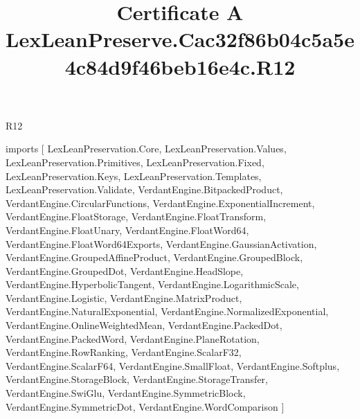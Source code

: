 \begin{lexlean}{R12}
\title{Certificate A LexLeanPreserve.Cac32f86b04c5a5e4c84d9f46beb16e4c.R12}
\begin{coremodule}
imports [
  LexLeanPreservation.Core,
  LexLeanPreservation.Values,
  LexLeanPreservation.Primitives,
  LexLeanPreservation.Fixed,
  LexLeanPreservation.Keys,
  LexLeanPreservation.Templates,
  LexLeanPreservation.Validate,
  VerdantEngine.BitpackedProduct,
  VerdantEngine.CircularFunctions,
  VerdantEngine.ExponentialIncrement,
  VerdantEngine.FloatStorage,
  VerdantEngine.FloatTransform,
  VerdantEngine.FloatUnary,
  VerdantEngine.FloatWord64,
  VerdantEngine.FloatWord64Exports,
  VerdantEngine.GaussianActivation,
  VerdantEngine.GroupedAffineProduct,
  VerdantEngine.GroupedBlock,
  VerdantEngine.GroupedDot,
  VerdantEngine.HeadSlope,
  VerdantEngine.HyperbolicTangent,
  VerdantEngine.LogarithmicScale,
  VerdantEngine.Logistic,
  VerdantEngine.MatrixProduct,
  VerdantEngine.NaturalExponential,
  VerdantEngine.NormalizedExponential,
  VerdantEngine.OnlineWeightedMean,
  VerdantEngine.PackedDot,
  VerdantEngine.PackedWord,
  VerdantEngine.PlaneRotation,
  VerdantEngine.RowRanking,
  VerdantEngine.ScalarF32,
  VerdantEngine.ScalarF64,
  VerdantEngine.SmallFloat,
  VerdantEngine.Softplus,
  VerdantEngine.StorageBlock,
  VerdantEngine.StorageTransfer,
  VerdantEngine.SwiGlu,
  VerdantEngine.SymmetricBlock,
  VerdantEngine.SymmetricDot,
  VerdantEngine.WordComparison
]


\end{coremodule}
\end{lexlean}
